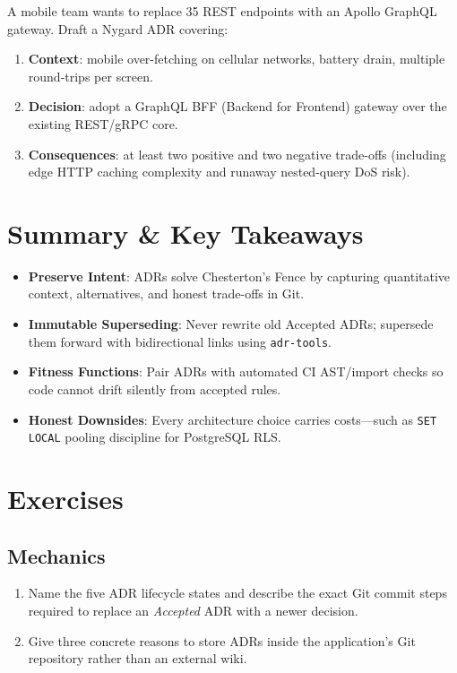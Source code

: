 \begin{tryityourselfbox}
A mobile team wants to replace 35 REST endpoints with an Apollo GraphQL gateway. Draft a Nygard ADR covering:
\begin{enumerate}
  \item \textbf{Context}: mobile over-fetching on cellular networks, battery drain, multiple round-trips per screen.
  \item \textbf{Decision}: adopt a GraphQL BFF (Backend for Frontend) gateway over the existing REST/gRPC core.
  \item \textbf{Consequences}: at least two positive and two negative trade-offs (including edge HTTP caching complexity and runaway nested-query DoS risk).
\end{enumerate}
\end{tryityourselfbox}

\section{Summary \protect\& Key Takeaways}

\begin{itemize}[leftmargin=18pt]
  \item \textbf{Preserve Intent}: ADRs solve Chesterton's Fence by capturing quantitative context, alternatives, and honest trade-offs in Git.
  \item \textbf{Immutable Superseding}: Never rewrite old Accepted ADRs; supersede them forward with bidirectional links using \texttt{adr-tools}.
  \item \textbf{Fitness Functions}: Pair ADRs with automated CI AST/import checks so code cannot drift silently from accepted rules.
  \item \textbf{Honest Downsides}: Every architecture choice carries costs—such as \texttt{SET LOCAL} pooling discipline for PostgreSQL RLS.
\end{itemize}

\section{Exercises}

\subsection*{Mechanics}
\begin{enumerate}[label=\textbf{Exercise~\thechapter.\arabic*}, leftmargin=*]
  \item Name the five ADR lifecycle states and describe the exact Git commit steps required to replace an \emph{Accepted} ADR with a newer decision.
  \item Give three concrete reasons to store ADRs inside the application's Git repository rather than an external wiki.
\end{enumerate}

